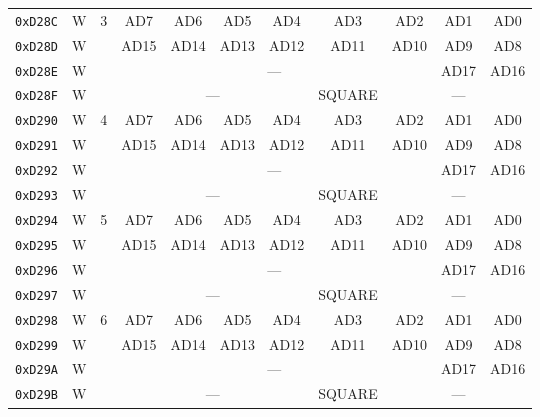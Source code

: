 \begin{table}[ht]
\begin{center}
\begin{tabular}{|c|c|c|c|c|c|c|c|c|c|c|}
            \verb+0xD28C+ & W & \multirow{4}{*}{3} & AD7 & AD6 & AD5 & AD4 & AD3 & AD2 & AD1 & AD0 \\ \cline{1-2}\cline{4-11}
            \verb+0xD28D+ & W &                    & AD15 & AD14 & AD13 & AD12 & AD11 & AD10 & AD9 & AD8 \\ \cline{1-2}\cline{4-11}
            \verb+0xD28E+ & W &                    & \multicolumn{6}{|c|}{---} & AD17 & AD16 \\ \cline{1-2}\cline{4-11}
            \verb+0xD28F+ & W &                    & \multicolumn{4}{|c|}{---} & SQUARE & \multicolumn{3}{|c|}{---} \\ \hline\hline

            \verb+0xD290+ & W & \multirow{4}{*}{4} & AD7 & AD6 & AD5 & AD4 & AD3 & AD2 & AD1 & AD0 \\ \cline{1-2}\cline{4-11}
            \verb+0xD291+ & W &                    & AD15 & AD14 & AD13 & AD12 & AD11 & AD10 & AD9 & AD8 \\ \cline{1-2}\cline{4-11}
            \verb+0xD292+ & W &                    & \multicolumn{6}{|c|}{---} & AD17 & AD16 \\ \cline{1-2}\cline{4-11}
            \verb+0xD293+ & W &                    & \multicolumn{4}{|c|}{---} & SQUARE & \multicolumn{3}{|c|}{---} \\ \hline\hline

            \verb+0xD294+ & W & \multirow{4}{*}{5} & AD7 & AD6 & AD5 & AD4 & AD3 & AD2 & AD1 & AD0 \\ \cline{1-2}\cline{4-11}
            \verb+0xD295+ & W &                    & AD15 & AD14 & AD13 & AD12 & AD11 & AD10 & AD9 & AD8 \\ \cline{1-2}\cline{4-11}
            \verb+0xD296+ & W &                    & \multicolumn{6}{|c|}{---} & AD17 & AD16 \\ \cline{1-2}\cline{4-11}
            \verb+0xD297+ & W &                    & \multicolumn{4}{|c|}{---} & SQUARE & \multicolumn{3}{|c|}{---} \\ \hline\hline

            \verb+0xD298+ & W & \multirow{4}{*}{6} & AD7 & AD6 & AD5 & AD4 & AD3 & AD2 & AD1 & AD0 \\ \cline{1-2}\cline{4-11}
            \verb+0xD299+ & W &                    & AD15 & AD14 & AD13 & AD12 & AD11 & AD10 & AD9 & AD8 \\ \cline{1-2}\cline{4-11}
            \verb+0xD29A+ & W &                    & \multicolumn{6}{|c|}{---} & AD17 & AD16 \\ \cline{1-2}\cline{4-11}
            \verb+0xD29B+ & W &                    & \multicolumn{4}{|c|}{---} & SQUARE & \multicolumn{3}{|c|}{---} \\ \hline\hline


\end{tabular}
\end{center}
\end{table}
